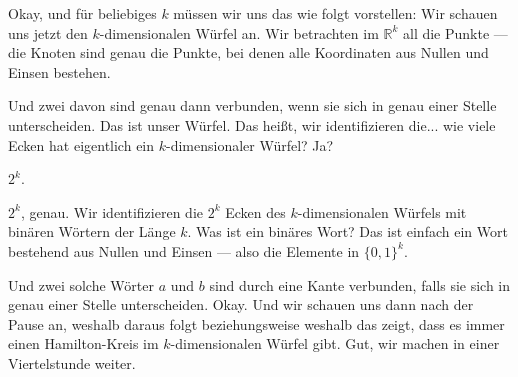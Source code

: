 \begin{math-stroke}
\begin{center}
\end{center}
\end{math-stroke}

\begin{spoken-clean}[00:39:52 - 00:41:53]
Okay, und für beliebiges $k$ müssen wir uns das wie folgt vorstellen: Wir schauen uns jetzt den $k$-dimensionalen Würfel an. Wir betrachten im $\mathbb{R}^k$ all die Punkte --- die Knoten sind genau die Punkte, bei denen alle Koordinaten aus Nullen und Einsen bestehen.

Und zwei davon sind genau dann verbunden, wenn sie sich in genau einer Stelle unterscheiden. Das ist unser Würfel. Das heißt, wir identifizieren die... wie viele Ecken hat eigentlich ein $k$-dimensionaler Würfel? Ja?
\end{spoken-clean}

\begin{student-interaction}
$2^k$.
\end{student-interaction}

\begin{spoken-clean}[00:39:52 - 00:41:53]
$2^k$, genau. Wir identifizieren die $2^k$ Ecken des $k$-dimensionalen Würfels mit binären Wörtern der Länge $k$. Was ist ein binäres Wort? Das ist einfach ein Wort bestehend aus Nullen und Einsen --- also die Elemente in $\{0, 1\}^k$.

Und zwei solche Wörter $a$ und $b$ sind durch eine Kante verbunden, falls sie sich in genau einer Stelle unterscheiden. Okay. Und wir schauen uns dann nach der Pause an, weshalb daraus folgt beziehungsweise weshalb das zeigt, dass es immer einen Hamilton-Kreis im $k$-dimensionalen Würfel gibt. Gut, wir machen in einer Viertelstunde weiter.
\end{spoken-clean}


